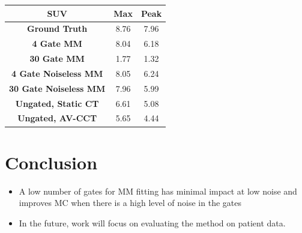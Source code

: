 \documentclass[portrait, color=UCLburgundy, margin=1cm]{uclposter}
\begin{document}
\begin{multicols}{2}
\begin{table}[H]
            \resizebox*{1.0\linewidth}{!}
            {
                \begin{tabular}{||c|cc||}
                    \hline
                    \textbf{\acrshort{SUV}}                 & \textbf{Max}  & \textbf{Peak} \\
                    \hline
                    \textbf{Ground Truth}                   & 8.76          & 7.96 \\
                    \hline
                    \textbf{4 Gate \gls{MM}}                & 8.04          & 6.18 \\
                    \textbf{30 Gate \gls{MM}}               & 1.77          & 1.32 \\
                    \hline
                    \textbf{4 Gate Noiseless \gls{MM}}      & 8.05          & 6.24 \\
                    \textbf{30 Gate Noiseless \gls{MM}}     & 7.96          & 5.99 \\
                    \hline
                    \textbf{Ungated, Static \acrshort{CT}}  & 6.61          & 5.08 \\
                    \textbf{Ungated, \acrlong{AV-CCT}}      & 5.65          & 4.44 \\
                    \hline
                \end{tabular}
            }
            \label{tab:suv}
        \end{table}
        
        \section*{Conclusion}
            \begin{highlightbox}[UCLlightgreen]
                \begin{itemize}
                    \item A low number of gates for \gls{MM} fitting has minimal impact at low noise and improves \gls{MC} when there is a high level of noise in the gates
                    \item In the future, work will focus on evaluating the method on patient data.
                \end{itemize}
            \end{highlightbox}
        
        \AtNextBibliography{\small}
        \printbibliography
    \end{multicols}
\end{document}
